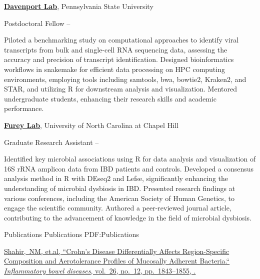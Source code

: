 \documentclass[letterpaper,MMMyyyy,nonstopmode]{simpleresumecv}
\begin{document}
\begin{Body}
\Entry
\href{https://davenport-lab.github.io/}
{\textbf{Davenport Lab}},
Pennsylvania State University

\Gap
\BulletItem
Postdoctoral Fellow
\hfill
{} --
\begin{Detail}
\SubBulletItem
Piloted a benchmarking study on computational approaches to identify viral transcripts from bulk and single-cell RNA sequencing data, assessing the accuracy and precision of transcript identification.
\SubBulletItem
Designed bioinformatics workflows in snakemake for efficient data processing on HPC computing environments, employing tools including samtools, bwa, bowtie2, Kraken2, and STAR, and utilizing R for downstream analysis and visualization.
\SubBulletItem
Mentored undergraduate students, enhancing their research skills and academic performance.
\end{Detail}

\BigGap
\Entry
\href{http://www.example.com/my-institute}
{\textbf{Furey Lab}},
University of North Carolina at Chapel Hill

\Gap
\BulletItem
Graduate Research Assistant
\hfill
{} --
\begin{Detail}
\SubBulletItem
Identified key microbial associations using R for data analysis and visualization of 16S rRNA amplicon data from IBD patients and controls.
\SubBulletItem
Developed a consensus analysis method in R with DEseq2 and Lefse, significantly enhancing the understanding of microbial dysbiosis in IBD.
\SubBulletItem
Presented research findings at various conferences, including the American Society of Human Genetics, to engage the scientific community.
\SubBulletItem
Authored a peer-reviewed journal article, contributing to the advancement of knowledge in the field of microbial dysbiosis.
\end{Detail}

\Section
{Publications}
{Publications}
{PDF:Publications}

\Entry
\href{https://pubmed.ncbi.nlm.nih.gov/32469069/}
{\underline{Shahir,~NM}, et.al,
``Crohn's Disease Differentially Affects Region-Specific Composition and Aerotolerance Profiles of Mucosally Adherent Bacteria.``
\textit{ Inflammatory bowel diseases},
vol.~26,
no.~12,
pp.~1843--1855,
.}



\end{Body}
\end{document}

